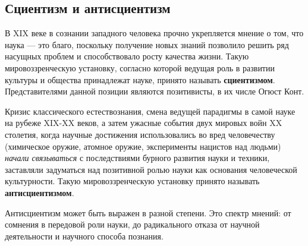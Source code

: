 \subsection{Сциентизм и антисциентизм}

В XIX веке в сознании западного человека прочно укрепляется мнение о том, что наука --- это благо, поскольку получение новых знаний позволило решить ряд насущных проблем и способствовало росту качества жизни. Такую мировоззренческую установку, согласно которой
ведущая роль в развитии культуры и общества принадлежат науке, принято называть \textbf{сциентизмом}. Представителями данной позиции являются позитивисты, в их числе Огюст Конт.


Кризис классического естествознания, смена ведущей парадигмы в самой науке на рубеже XIX-XX веков, а затем ужасные события двух мировых войн XX столетия, когда научные достижения использовались во вред человечеству (химическое оружие, атомное оружие, эксперименты
нацистов над людьми) \textit{начали связываться} с последствиями бурного развития науки и техники, заставляли задуматься над позитивной ролью науки как основания человеческой культурности.
Такую мировоззренческую установку принято называть \textbf{антисциентизмом}.




Антисциентизм может быть выражен в разной степени. Это спектр мнений: от сомнения в передовой
роли науки, до радикального отказа от научной деятельности и научного способа познания. 

